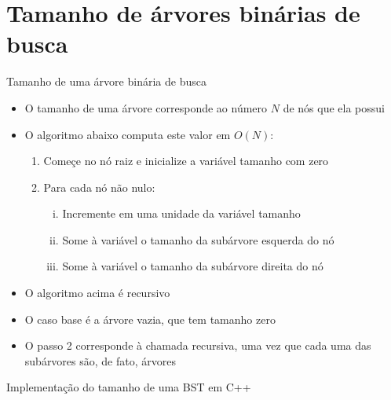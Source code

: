 \section{Tamanho de árvores binárias de busca}

\begin{frame}[fragile]{Tamanho de uma árvore binária de busca}

    \begin{itemize}
        \item O tamanho de uma árvore corresponde ao número $N$ de nós que ela possui

        \item O algoritmo abaixo computa este valor em $O(N)$:

        \begin{enumerate}

            \item Começe no nó {raiz} e inicialize a variável tamanho com 
            {zero}

            \item Para cada nó {não nulo}:

            \begin{enumerate}[i.]
                \item Incremente em {uma} unidade da variável {tamanho}

                \item {Some} à variável o tamanho da subárvore {esquerda} do nó

                \item {Some} à variável o tamanho da subárvore {direita} do nó
            \end{enumerate}

        \end{enumerate}

        \item O algoritmo acima é recursivo

        \item O caso base é a árvore vazia, que tem tamanho zero

        \item O passo 2 corresponde à chamada recursiva, uma vez que cada uma das subárvores são,
            de fato, árvores

    \end{itemize}
\end{frame} 

\begin{frame}[fragile]{Implementação do tamanho de uma BST em C++}
\end{frame}

